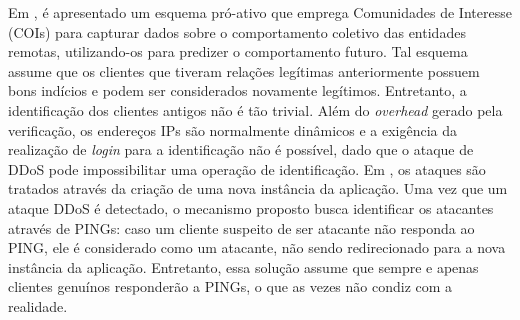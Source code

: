Em \cite{Verkaik:2006:PCD:1162666.1162673}, é apresentado um esquema pró-ativo que emprega Comunidades de Interesse (COIs) para capturar dados sobre o comportamento coletivo das entidades remotas, utilizando-os para predizer o comportamento futuro. Tal esquema assume que os clientes que tiveram relações legítimas anteriormente possuem bons indícios e podem ser considerados novamente legítimos. %
%
Entretanto, a identificação dos clientes antigos não é tão trivial. Além do \emph{overhead} gerado pela verificação, os endereços IPs são normalmente dinâmicos e a exigência da realização de \emph{login} para a identificação não é possível, dado que o ataque de DDoS pode impossibilitar uma operação de identificação.
%
%
Em \cite{Bakshi:10}, os ataques são tratados através da criação de uma nova instância da aplicação. Uma vez que um ataque DDoS é detectado, o mecanismo proposto busca identificar os atacantes através de PINGs: caso um cliente suspeito de ser atacante não responda ao PING, ele é considerado como um atacante, não sendo redirecionado para a nova instância da aplicação. 
Entretanto, essa solução assume que sempre e apenas clientes genuínos responderão a PINGs, o que as vezes não condiz com a realidade.





